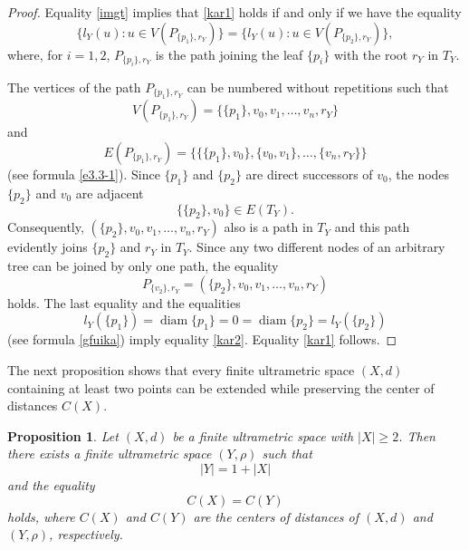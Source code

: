 \documentclass[pdflatex,sn-mathphys-num]{sn-jnl}%
\theoremstyle{thmstyleone}%
\newtheorem{Proposition}[Theorem]{Proposition}
\theoremstyle{thmstyletwo}%
\theoremstyle{thmstylethree}%
\theoremstyle{thmstyletwo}%
\theoremstyle{thmstylethree}%
\begin{document}
\begin{proof}
Equality \eqref{imgt} implies that \eqref{kar1} holds if and only if we have the equality
\begin{equation}
    \label{kar2}
\{l_Y(u)\colon u \in V(P_{\{p_1\},r_Y})\}=\{l_Y(u)\colon u \in V(P_{\{p_2\},r_Y})\},
\end{equation}
where, for $i=1,2$, $P_{\{p_i\},r_Y}$ is the path 
 joining the leaf $\{p_i\}$ with the root $r_Y$ in $T_Y$. 
 
 The vertices of the path $P_{\{p_1\},r_Y}$ can be numbered without repetitions such that
\[
V(P_{\{p_1\},r_Y})=\{\{p_1\},v_0,v_1,\ldots,v_n,r_Y\}
\]
and
\[
E(P_{\{p_1\},r_Y})=\{\{\{p_1\},v_0\},\{v_0,v_1\},\ldots,\{v_n,r_Y\}\}
\]
(see formula \eqref{e3.3-1}).
Since $\{p_1\}$ and $\{p_2\}$ are direct successors of $v_0$, the nodes $\{p_2\}$ and $v_0$ are adjacent 
\[
\{\{p_2\},v_0\}\in E(T_Y).
\]
Consequently,
\(
(\{p_2\},v_0,v_1,\ldots,v_n,r_Y)
\)
also is  a path in $T_Y$ and this path evidently joins $\{p_2\}$ and $r_Y$ in $T_Y$. Since any two different nodes of an arbitrary tree can be joined by only one path,  the equality
\[
P_{\{v_2\},r_Y}=(\{p_2\},v_0,v_1,\ldots,v_n,r_Y)
\]
holds.
The last equality and the equalities 
\[
l_Y(\{p_1\})=
\operatorname{diam}\{p_1\}=0=\operatorname{diam}\{p_2\}=l_Y(\{p_2\})
\]
(see formula \eqref{gfuika})  imply equality \eqref{kar2}. Equality \eqref{kar1} follows.
\end{proof}




The next proposition shows that every finite ultrametric space $(X,d)$ containing at least two points can be extended while preserving the center of distances $C(X)$.

\begin{Proposition}\label{woorf}
Let $(X,d)$ be a finite ultrametric space with $|X|\ge 2$. Then there exists a finite ultrametric space $(Y,\rho)$ such that
\begin{equation}
    \label{ned}
|Y|=1+|X|
\end{equation}
and  the equality
\begin{equation}\label{gaf1}
C(X)=C(Y)
\end{equation}
holds, where $C(X)$ and $C(Y)$ are the centers of distances of $(X,d)$ and $(Y,\rho)$, respectively.
\end{Proposition}
\end{document}
